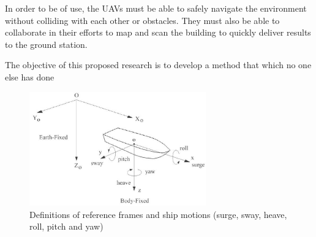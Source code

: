 \documentclass[12pt, letterpaper]{article}
\begin{document}
In order to be of use, the UAVs must be able to safely navigate the environment without colliding with each other or obstacles. They must also be able to collaborate in their efforts to map and scan the building to quickly deliver results to the ground station.

The objective of this proposed research is to develop a method that
which no one else has done 




\begin{figure}[h] %
   \centering
   \includegraphics[trim = 0mm 0mm 0mm 0mm,clip,width=3in]{ship_motions.png}
   \caption{Definitions of reference frames and ship motions (surge, sway, heave, roll, pitch and yaw)}
   \label{fig:shipmotions}
\end{figure}
\end{document}
